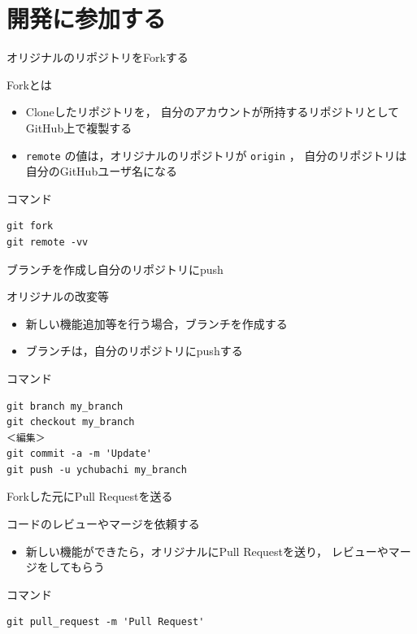 \documentclass[t, aspectratio=169]{beamer}
\begin{document}
\section{開発に参加する}
\label{sec-4-2}
\begin{frame}[fragile,label=sec-4-2-1]{オリジナルのリポジトリをForkする}
 \begin{block}{Forkとは}
\begin{itemize}
\item Cloneしたリポジトリを，
自分のアカウントが所持するリポジトリとして
GitHub上で複製する
\item \texttt{remote} の値は，オリジナルのリポジトリが \texttt{origin} ，
自分のリポジトリは自分のGitHubユーザ名になる
\end{itemize}
\end{block}
\begin{block}{コマンド}
\begin{verbatim}
git fork
git remote -vv
\end{verbatim}
\end{block}
\end{frame}

\begin{frame}[fragile,label=sec-4-2-2]{ブランチを作成し自分のリポジトリにpush}
 \begin{block}{オリジナルの改変等}
\begin{itemize}
\item 新しい機能追加等を行う場合，ブランチを作成する
\item ブランチは，自分のリポジトリにpushする
\end{itemize}
\end{block}
\begin{block}{コマンド}
\begin{verbatim}
git branch my_branch
git checkout my_branch
＜編集＞
git commit -a -m 'Update'
git push -u ychubachi my_branch
\end{verbatim}
\end{block}
\end{frame}

\begin{frame}[fragile,label=sec-4-2-3]{Forkした元にPull Requestを送る}
 \begin{block}{コードのレビューやマージを依頼する}
\begin{itemize}
\item 新しい機能ができたら，オリジナルにPull Requestを送り，
レビューやマージをしてもらう
\end{itemize}
\end{block}
\begin{block}{コマンド}
\begin{verbatim}
git pull_request -m 'Pull Request'
\end{verbatim}
\end{block}
\end{frame}
\end{document}
